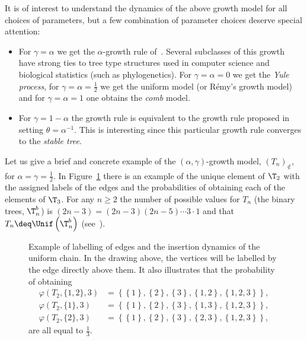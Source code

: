 It is of interest to understand the dynamics of the above growth model for all choices of parameters, but a few combination of parameter choices deserve special attention:
%
\begin{itemize}
  \item For $\gamma = \alpha$ we get the $\alpha$-growth rule of~\cite{RefWorks:doc:5b76ce32e4b0820c421f301d}.
    Several subclasses of this growth have strong ties to tree type structures used in computer science and biological statistics (such as phylogenetics).
    For $\gamma = \alpha = 0$ we get the \textit{Yule process}, for $\gamma = \alpha = \frac{1}{2}$ we get the uniform model (or R\'{e}my's growth model) and for $\gamma = \alpha = 1$ one obtains the \textit{comb} model.
  \item For $\gamma = 1 - \alpha$ the growth rule is equivalent to the growth rule proposed in~\cite{RefWorks:doc:5b6c561fe4b06c0731a5c558} setting $\theta = \alpha^{-1}$.
    This is interesting since this particular growth rule converges to the \textit{stable tree}.
\end{itemize}
%
\begin{example}\label{unifgrowth}
  Let us give a brief and concrete example of the $(\alpha, \gamma)$-growth model, ${\left( T_n \right)}_\nin$, for $\alpha = \gamma = \frac{1}{2}$.
  In Figure~\ref{fig:unifchain} there is an example of the unique element of $\T_2$ with the assigned labels of the edges and the probabilities of obtaining each of the elements of $\T_3$.
  For any $n \geq 2$ the number of possible values for $T_n$ (the binary trees, $\T_n^b$) is $(2n - 3)\!\! = (2n - 3)(2n - 5) \cdots 3 \cdot 1$ and that $T_n \deq \Unif \left( \T_n^b \right)$ (see~).
  \begin{figure}[t]
    \centering
    
    \captionsetup{singlelinecheck=off}
    \caption[fig:unifchain]{Example of labelling of edges and the insertion dynamics of the uniform chain.
      In the drawing above, the vertices will be labelled by the edge directly above them.
      It also illustrates that the probability of obtaining
      \begin{align*}
        \varphi\left( T_2, \{1,2\},3 \right) &= \left\{ \left\{ 1 \right\}, \left\{ 2 \right\}, \left\{ 3 \right\}, \left\{ 1,2 \right\}, \left\{ 1,2,3 \right\} \right\}, \\
        \varphi\left( T_2, \{1\},3 \right) &= \left\{ \left\{ 1 \right\}, \left\{ 2 \right\}, \left\{ 3 \right\}, \left\{ 1,3 \right\}, \left\{ 1,2,3 \right\} \right\}, \\
        \varphi\left( T_2, \{2\},3 \right) &= \left\{ \left\{ 1 \right\}, \left\{ 2 \right\}, \left\{ 3 \right\}, \left\{ 2,3 \right\}, \left\{ 1,2,3 \right\} \right\},
      \end{align*}
      are all equal to $\frac{1}{3}$.
    }\label{fig:unifchain}
%
  \end{figure}
\end{example}
